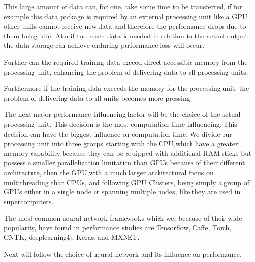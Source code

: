 \documentclass[conference]{IEEEtran}
\begin{document}
This large amount of data can, for one, take some time to be transferred, if for example this data package is required by an external processing unit like a GPU other units cannot receive new data and therefore the performance drops due to them being idle. Also if too much data is needed in relation to the actual output the data storage can achieve enduring performance loss will occur.  

Further can the required training data exceed direct accessible memory from the processing unit, enhancing the problem of delivering data to all processing units.

Furthermore if the training data exceeds the memory for the processing unit, the problem of delivering data to all units becomes more pressing.



The next major performance influencing factor will be the choice of the actual processing unit. This decision is the most computation time influencing. This decision can have the biggest influence on computation time. We divide our processing unit into three groups starting with the CPU,which have a greater memory capability because they can be equipped with additional RAM sticks but possess a smaller parallelization limitation than GPUs because of their different architecture, then the GPU,with a much larger architectural focus on multithreading than CPUs, and following GPU Clusters, being simply a group of GPUs either in a single node or spanning multiple nodes, like they are used in supercomputers.



The most common neural network frameworks which we, because of their wide popularity, have found in performance studies are Tensorflow\cite{abadi2016tensorflow}, Caffe\cite{jia2014caffe}, Torch\cite{collobert2002torch}, CNTK\cite{gitcntk}, deeplearning4j\cite{websitedl4j}, Keras\cite{websitekeras}, and MXNET\cite{websitemxnet}.






Next will follow the choice of neural network and its influence on performance.
\end{document}
